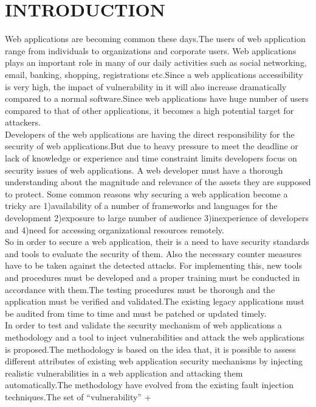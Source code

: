 \chapter{INTRODUCTION}\label{chp:chapter1}
\thispagestyle{fancy}
Web applications are becoming common these days.The users of web 
application range from individuals to organizations and corporate users.
Web applications plays an important role in many of our daily activities such as social networking, email, banking, shopping,
registrations etc.Since a web applications accessibility is very high, the impact of vulnerability in it will also increase dramatically compared to a normal software.Since web applications have huge number of users compared to that of other applications, it becomes a high potential target for attackers.
\\
\newline
Developers of the web applications are having the direct responsibility for the security of web applications.But due to heavy pressure to meet the deadline or lack of knowledge or experience and time constraint limits developers focus on security issues of web applications. A web developer must have a thorough understanding about the magnitude and relevance of the assets they are supposed to protect. Some common reasons why securing a web application become a tricky are 1)availability of a number of frameworks and languages for the development 2)exposure to large number of audience 3)inexperience of developers and 4)need for accessing organizational resources remotely.  \\ 
\newline
So in order to secure a web application, their is a need to have security standards and tools to evaluate the security of them. Also the necessary counter measures have to be taken against the detected attacks. For implementing this, new tools and procedures must be developed and a proper training must be conducted in accordance with them.The testing procedures must be thorough and the application must be verified and validated.The existing legacy applications must be audited from time to time and must be patched or updated timely.\\
\newline
In order to test and validate the security mechanism of web applications a methodology and a tool to inject vulnerabilities and attack the web applications is proposed.The methodology is based on the idea that, it is possible to assess different attributes of existing web application security mechanisms by injecting realistic vulnerabilities in a web application and attacking them automatically.The methodology have evolved from the existing fault injection techniques.The set of ``vulnerability'' +
